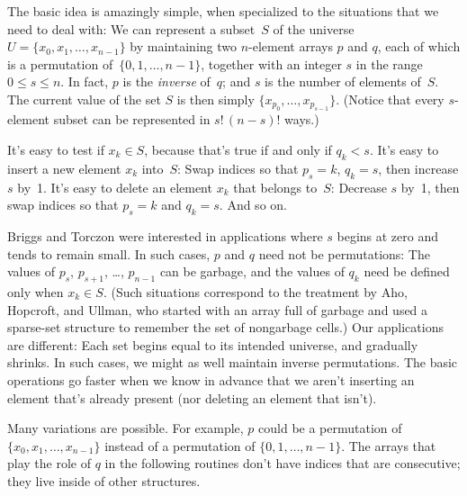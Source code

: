 The basic idea is amazingly simple, when specialized to the situations
that we need to deal with: We can represent a subset~$S$ of the universe
$U=\{x_0,x_1,\ldots,x_{n-1}\}$ by maintaining two $n$-element arrays
$p$ and $q$, each of which is a permutation of~$\{0,1,\ldots,n-1\}$,
together with an integer $s$ in the range $0\le s\le n$. In fact, $p$ is
the {\it inverse\/} of~$q$; and $s$ is the number of elements of~$S$.
The current value of the set $S$ is then simply
$\{x_{p_0},\ldots,x_{p_{s-1}}\}$. (Notice that every $s$-element subset can be
represented in $s!\,(n-s)!$ ways.)

It's easy to test if $x_k\in S$, because that's true if and only if $q_k<s$.
It's easy to insert a new element $x_k$ into~$S$: Swap indices
so that $p_s=k$, $q_k=s$, then increase $s$ by~1.
It's easy to delete an element $x_k$ that belongs to~$S$: Decrease $s$
by~1, then swap indices so that $p_s=k$ and $q_k=s$.
And so on.

Briggs and Torczon were interested in applications where $s$ begins at
zero and tends to remain small. In such cases, $p$ and $q$ need not
be permutations: The values of $p_s$, $p_{s+1}$, \dots, $p_{n-1}$ can
be garbage, and the values of $q_k$ need be defined only when $x_k\in S$.
(Such situations correspond to the treatment by Aho, Hopcroft, and Ullman,
who started
with an array full of garbage and used a sparse-set structure to remember
the set of nongarbage cells.) Our applications are different: Each set
begins equal to its intended universe, and gradually shrinks. In such
cases, we might as well maintain inverse permutations.
The basic operations go faster when we know in advance that we
aren't inserting an element that's already present (nor deleting an element
that isn't).

Many variations are possible. For example, $p$ could be a permutation
of $\{x_0,x_1,\ldots,x_{n-1}\}$ instead of a permutation of
$\{0,1,\ldots,n-1\}$. The arrays that play the role of $q$
in the following routines don't have indices that are consecutive;
they live inside of other structures.

\fi

